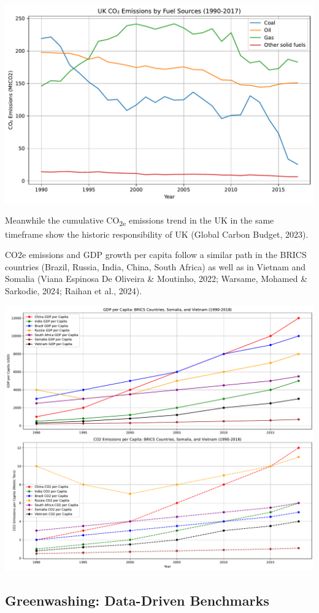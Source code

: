 \documentclass[
  letterpaper,
  DIV=11,
  numbers=noendperiod]{scrartcl}
\begin{document}
\includegraphics{_thesis_files/figure-pdf/cell-44-output-1.pdf}

Meanwhile the cumulative CO\textsubscript{2e} emissions trend in the UK
in the same timeframe show the historic responsibility of UK (Global
Carbon Budget, 2023).

CO2e emissions and GDP growth per capita follow a similar path in the
BRICS countries (Brazil, Russia, India, China, South Africa) as well as
in Vietnam and Somalia (Viana Espinosa De Oliveira \& Moutinho, 2022;
Warsame, Mohamed \& Sarkodie, 2024; Raihan et al., 2024).

\includegraphics{_thesis_files/figure-pdf/cell-45-output-1.pdf}

\subsection{Greenwashing: Data-Driven
Benchmarks}\label{greenwashing-data-driven-benchmarks}
\end{document}
